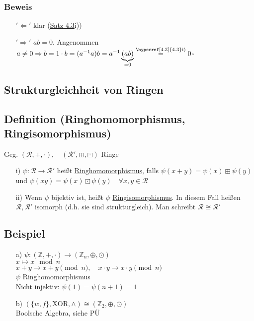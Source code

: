 \documentclass[12pt,titlepage, pdf]{article}
\newcommand{\uline}[1]{\underline{#1}}
\newcommand{\qed}{\hfill$\square$}
\renewcommand{\>}{\rightarrow}
\renewcommand{\*}{\cdot}
\begin{document}
	\subsubsection*{Beweis}
	\begin{itemize}
		\item[$'\Leftarrow'$] klar (\hyperref[4.3]{Satz 4.3}i))
		\item[$'\Rightarrow'$] $ab = 0$. Angenommen $a \neq 0 \Rightarrow b=1 \cdot b = (a^{-1}a)b = a^{-1}\underbrace{(ab)}_{= 0} \overset{\textrm{\hyperref[4.3]{4.3}i)}}{=} 0$\qed
	\end{itemize}
	
	\subsection*{Strukturgleichheit von Ringen}
	\subsection{Definition (Ringhomomorphismus, Ringisomorphismus)}
	Geg. $(\mathcal{R}, + , \cdot),\quad (\mathcal{R}', \boxplus, \boxdot)$  Ringe
	\begin{itemize}
		\item[i)]$\psi: \mathcal{R} \rightarrow \mathcal{R}'$ heißt \uline{Ringhomomorphismus}, falls $\psi(x+y) = \psi(x) \boxplus \psi(y)$ und $\psi(xy)= \psi(x) \boxdot \psi(y)\quad \forall x,y \in \mathcal{R}$
		\item[ii)] Wenn $\psi$ bijektiv ist, heißt $\psi$ \uline{Ringisomorphismus}. In diesem Fall heißen $\mathcal{R}, \mathcal{R}'$ isomorph (d.h. sie sind strukturgleich). Man schreibt $\mathcal{R} \cong \mathcal{R}'$
	\end{itemize}
	
	\subsection{Beispiel}
	\begin{itemize}
		\item[a)] $\psi: (\mathds{Z}, + ,\cdot) \rightarrow (\mathds{Z}_n,\oplus, \odot)$\\
		\noindent\hspace*{17mm}$x \mapsto x \mod n$\\
		$x +y \rightarrow x+y \pmod{n},\quad x \cdot y \rightarrow x \cdot y \pmod{n}$\\
		$\psi$ Ringhomomorphismus\\
		Nicht injektiv: $\psi(1)=\psi(n+1)=1$
		\item[b)]  $(\{w,f\}, \text{XOR}, \land) \cong (\mathds{Z}_2, \oplus, \odot)$\\
		Boolsche Algebra, siehe PÜ
	\end{itemize}
\end{document}
